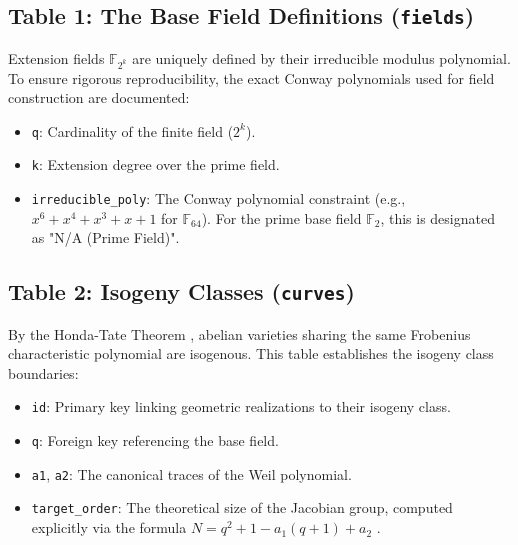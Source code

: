 \documentclass[letterpaper, 11pt]{article}
\begin{document}
	\subsection{Table 1: The Base Field Definitions (\texttt{fields})}
	Extension fields $\mathbb{F}_{2^k}$ are uniquely defined by their irreducible modulus polynomial. To ensure rigorous reproducibility, the exact Conway polynomials used for field construction are documented:
	\begin{itemize}
		\item \texttt{q}: Cardinality of the finite field ($2^k$).
		\item \texttt{k}: Extension degree over the prime field.
		\item \texttt{irreducible\_poly}: The Conway polynomial constraint (e.g., $x^6 + x^4 + x^3 + x + 1$ for $\mathbb{F}_{64}$). For the prime base field $\mathbb{F}_2$, this is designated as "N/A (Prime Field)".
	\end{itemize}
	
	\subsection{Table 2: Isogeny Classes (\texttt{curves})}
	By the Honda-Tate Theorem \cite{Honda1968}, abelian varieties sharing the same Frobenius characteristic polynomial are isogenous. This table establishes the isogeny class boundaries:
	\begin{itemize}
		\item \texttt{id}: Primary key linking geometric realizations to their isogeny class.
		\item \texttt{q}: Foreign key referencing the base field.
		\item \texttt{a1}, \texttt{a2}: The canonical traces of the Weil polynomial.
		\item \texttt{target\_order}: The theoretical size of the Jacobian group, computed explicitly via the formula $N = q^2 + 1 - a_1(q + 1) + a_2$ \cite{Waterhouse1969}.
	\end{itemize}
	
\end{document}
